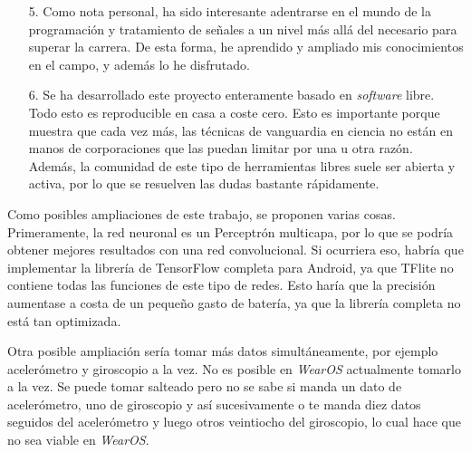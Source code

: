 \documentclass[12pt]{book}
\numberwithin{equation}{section}
\begin{document}
\begin{enumerate}
\item[5.] Como nota personal, ha sido interesante adentrarse en el mundo de la programación y tratamiento de señales a un nivel más allá del necesario para superar la carrera. De esta forma, he aprendido y ampliado mis conocimientos en el campo, y además lo he disfrutado.

\item[6.] Se ha desarrollado este proyecto enteramente basado en \textit{software} libre. Todo esto es reproducible en casa a coste cero. Esto es importante porque muestra que cada vez más, las técnicas de vanguardia en ciencia no están en manos de corporaciones que las puedan limitar por una u otra razón. Además, la comunidad de este tipo de herramientas libres suele ser abierta y activa, por lo que se resuelven las dudas bastante rápidamente.
\end{enumerate}

Como posibles ampliaciones de este trabajo, se proponen varias cosas. Primeramente, la red neuronal es un Perceptrón multicapa, por lo que se podría obtener mejores resultados con una red convolucional. Si ocurriera eso, habría que implementar la librería de TensorFlow completa para Android, ya que TFlite no contiene todas las funciones de este tipo de redes. Esto haría que la precisión aumentase a costa de un pequeño gasto de batería, ya que la librería completa no está tan optimizada.

Otra posible ampliación sería tomar más datos simultáneamente, por ejemplo acelerómetro y giroscopio a la vez. No es posible en \textit{WearOS} actualmente tomarlo a la vez. Se puede tomar salteado pero no se sabe si manda un dato de acelerómetro, uno de giroscopio y así sucesivamente o te manda diez datos seguidos del acelerómetro y luego otros veintiocho del giroscopio, lo cual hace que no sea viable en \textit{WearOS}.




\nocite{*}


\end{document}
